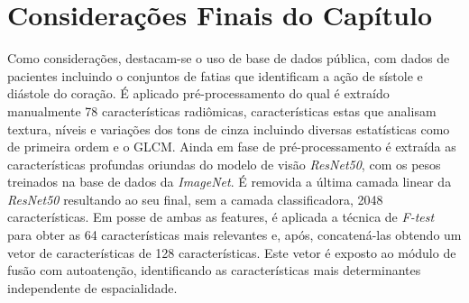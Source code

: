 

\section{Considerações Finais do Capítulo}
\label{sec:cap4_consideracoes_finais}

Como considerações, destacam-se o uso de base de dados pública, com dados de pacientes incluindo o conjuntos de fatias que identificam a ação de sístole e diástole do coração. É aplicado pré-processamento do qual é extraído manualmente 78 características radiômicas, características estas que analisam textura, níveis e variações dos tons de cinza incluindo diversas estatísticas como de primeira ordem e o \gls{GLCM}. Ainda em fase de pré-processamento é extraída as características profundas oriundas do modelo de visão \textit{ResNet50}, com os pesos treinados na base de dados da \textit{ImageNet}. É removida a última camada linear da \textit{ResNet50} resultando ao seu final, sem a camada classificadora, 2048 características. Em posse de ambas as features, é aplicada a técnica de \textit{F-test} para obter as 64 características mais relevantes e, após, concatená-las obtendo um vetor de características de 128 características. Este vetor é exposto ao módulo de fusão com autoatenção, identificando as características mais determinantes independente de espacialidade. 